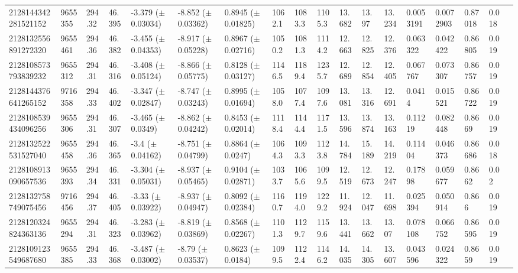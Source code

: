 \begin{sidewaystable}[htbp]
{\begin{tabular}{llllllllllllllllll}
        2128144342281521152 & 9655355 & 294.32 & 46.395 & -3.379 ($\pm$ 0.03034) & -8.852 ($\pm$ 0.03362) & 0.8945 ($\pm$ 0.01825) & 1062.1 & 1083.3 & 1105.3 & 13.682 & 13.97 & 13.234 & 0.0053191 & 0.0072903 & 0.87018 & 0.018 & \\
        2128132556891272320 & 9655461 & 294.36 & 46.382 & -3.455 ($\pm$ 0.04353) & -8.917 ($\pm$ 0.05228) & 0.8967 ($\pm$ 0.02716) & 1050.2 & 1081.3 & 1114.2 & 12.663 & 12.825 & 12.376 & 0.063322 & 0.042422 & 0.86805 & 0.019 & \\
        2128108573793839232 & 9655312 & 294.31 & 46.316 & -3.408 ($\pm$ 0.05124) & -8.866 ($\pm$ 0.05775) & 0.8128 ($\pm$ 0.03127) & 1146.5 & 1189.4 & 1235.7 & 12.689 & 12.854 & 12.405 & 0.067767 & 0.073307 & 0.86757 & 0.019 & \\
        2128144376641265152 & 9716358 & 294.33 & 46.402 & -3.347 ($\pm$ 0.02847) & -8.747 ($\pm$ 0.03243) & 0.8995 ($\pm$ 0.01694) & 1058.0 & 1077.4 & 1097.6 & 13.081 & 13.316 & 12.691 & 0.0414 & 0.015521 & 0.86722 & 0.019 & \\
        2128108539434096256 & 9655306 & 294.31 & 46.307 & -3.465 ($\pm$ 0.0349) & -8.862 ($\pm$ 0.04242) & 0.8453 ($\pm$ 0.02014) & 1118.4 & 1144.4 & 1171.5 & 13.596 & 13.874 & 13.163 & 0.11219 & 0.082448 & 0.8669 & 0.019 & \\
        2128132522531527040 & 9655458 & 294.36 & 46.365 & -3.4 ($\pm$ 0.04162) & -8.751 ($\pm$ 0.04799) & 0.8864 ($\pm$ 0.0247) & 1064.3 & 1093.3 & 1123.8 & 14.784 & 15.189 & 14.219 & 0.11404 & 0.046373 & 0.86686 & 0.018 & \\
        2128108913090657536 & 9655393 & 294.34 & 46.331 & -3.304 ($\pm$ 0.05031) & -8.937 ($\pm$ 0.05465) & 0.9104 ($\pm$ 0.02871) & 1033.7 & 1065.6 & 1099.5 & 12.519 & 12.673 & 12.247 & 0.17898 & 0.059677 & 0.8662 & 0.02 & \\
        2128132758749075456 & 9716456 & 294.37 & 46.405 & -3.33 ($\pm$ 0.03922) & -8.937 ($\pm$ 0.04947) & 0.8092 ($\pm$ 0.02384) & 1160.7 & 1194.0 & 1229.2 & 11.924 & 12.047 & 11.698 & 0.025394 & 0.050914 & 0.866 & 0.019 & \\
        2128120324824363136 & 9655294 & 294.31 & 46.323 & -3.283 ($\pm$ 0.03962) & -8.819 ($\pm$ 0.03869) & 0.8568 ($\pm$ 0.02267) & 1101.3 & 1129.7 & 1159.6 & 13.441 & 13.662 & 13.07 & 0.078108 & 0.066752 & 0.86595 & 0.019 & \\
        2128109123549687680 & 9655385 & 294.33 & 46.368 & -3.487 ($\pm$ 0.03002) & -8.79 ($\pm$ 0.03537) & 0.8623 ($\pm$ 0.0184) & 1099.5 & 1122.4 & 1146.2 & 14.035 & 14.305 & 13.607 & 0.043596 & 0.024322 & 0.8659 & 0.019 & \\

\end{tabular}}
\end{sidewaystable}
